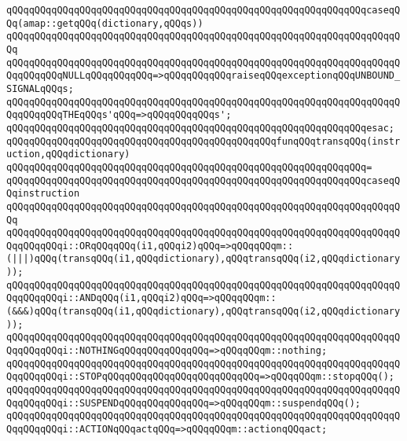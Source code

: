 \verb|qQQqqQQqqQQqqQQqqQQqqQQqqQQqqQQqqQQqqQQqqQQqqQQqqQQqqQQqqQQqqQQqcaseqQQq(amap::getqQQq(dictionary,qQQqs))|\newline
\verb|qQQqqQQqqQQqqQQqqQQqqQQqqQQqqQQqqQQqqQQqqQQqqQQqqQQqqQQqqQQqqQQqqQQqqQQq|\newline
\verb|qQQqqQQqqQQqqQQqqQQqqQQqqQQqqQQqqQQqqQQqqQQqqQQqqQQqqQQqqQQqqQQqqQQqqQQqqQQqqQQqNULLqQQqqQQqqQQq=>qQQqqQQqqQQqraiseqQQqexceptionqQQqUNBOUND_SIGNALqQQqs;|\newline
\verb|qQQqqQQqqQQqqQQqqQQqqQQqqQQqqQQqqQQqqQQqqQQqqQQqqQQqqQQqqQQqqQQqqQQqqQQqqQQqqQQqTHEqQQqs'qQQq=>qQQqqQQqqQQqs';|\newline
\verb|qQQqqQQqqQQqqQQqqQQqqQQqqQQqqQQqqQQqqQQqqQQqqQQqqQQqqQQqqQQqqQQqesac;|\newline
\newline
\newline
\verb|qQQqqQQqqQQqqQQqqQQqqQQqqQQqqQQqqQQqqQQqqQQqqQQqfunqQQqtransqQQq(instruction,qQQqdictionary)|\newline
\verb|qQQqqQQqqQQqqQQqqQQqqQQqqQQqqQQqqQQqqQQqqQQqqQQqqQQqqQQqqQQqqQQq=|\newline
\verb|qQQqqQQqqQQqqQQqqQQqqQQqqQQqqQQqqQQqqQQqqQQqqQQqqQQqqQQqqQQqqQQqcaseqQQqinstruction|\newline
\verb|qQQqqQQqqQQqqQQqqQQqqQQqqQQqqQQqqQQqqQQqqQQqqQQqqQQqqQQqqQQqqQQqqQQqqQQq|\newline
\verb|qQQqqQQqqQQqqQQqqQQqqQQqqQQqqQQqqQQqqQQqqQQqqQQqqQQqqQQqqQQqqQQqqQQqqQQqqQQqqQQqi::ORqQQqqQQq(i1,qQQqi2)qQQq=>qQQqqQQqm::(|\verb#|||)qQQq(transqQQq(i1,qQQqdictionary),qQQqtransqQQq(i2,qQQqdictionary));#\newline
\verb|qQQqqQQqqQQqqQQqqQQqqQQqqQQqqQQqqQQqqQQqqQQqqQQqqQQqqQQqqQQqqQQqqQQqqQQqqQQqqQQqi::ANDqQQq(i1,qQQqi2)qQQq=>qQQqqQQqm::(&&&)qQQq(transqQQq(i1,qQQqdictionary),qQQqtransqQQq(i2,qQQqdictionary));|\newline
\newline
\verb|qQQqqQQqqQQqqQQqqQQqqQQqqQQqqQQqqQQqqQQqqQQqqQQqqQQqqQQqqQQqqQQqqQQqqQQqqQQqqQQqi::NOTHINGqQQqqQQqqQQqqQQq=>qQQqqQQqm::nothing;|\newline
\verb|qQQqqQQqqQQqqQQqqQQqqQQqqQQqqQQqqQQqqQQqqQQqqQQqqQQqqQQqqQQqqQQqqQQqqQQqqQQqqQQqi::STOPqQQqqQQqqQQqqQQqqQQqqQQqqQQq=>qQQqqQQqm::stopqQQq();|\newline
\verb|qQQqqQQqqQQqqQQqqQQqqQQqqQQqqQQqqQQqqQQqqQQqqQQqqQQqqQQqqQQqqQQqqQQqqQQqqQQqqQQqi::SUSPENDqQQqqQQqqQQqqQQq=>qQQqqQQqm::suspendqQQq();|\newline
\verb|qQQqqQQqqQQqqQQqqQQqqQQqqQQqqQQqqQQqqQQqqQQqqQQqqQQqqQQqqQQqqQQqqQQqqQQqqQQqqQQqi::ACTIONqQQqactqQQq=>qQQqqQQqm::actionqQQqact;|\newline
